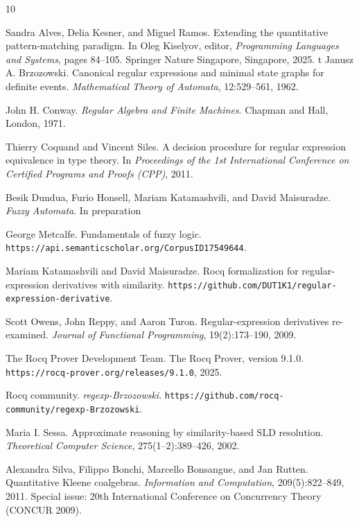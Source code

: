 \documentclass{easychair}
\begin{document}
\begin{thebibliography}{10}

Sandra Alves, Delia Kesner, and Miguel Ramos.
\newblock Extending the quantitative pattern-matching paradigm.
\newblock In Oleg Kiselyov, editor, \emph{Programming Languages and Systems},
pages 84--105.
\newblock Springer Nature Singapore, Singapore, 2025.
t
Janusz A. Brzozowski.
\newblock Canonical regular expressions and minimal state graphs for definite events.
\newblock \emph{Mathematical Theory of Automata}, 12:529--561, 1962.

John H. Conway.
\newblock \emph{Regular Algebra and Finite Machines}.
\newblock Chapman and Hall, London, 1971.

Thierry Coquand and Vincent Siles.
\newblock A decision procedure for regular expression equivalence in type theory.
\newblock In \emph{Proceedings of the 1st International Conference on Certified Programs and Proofs (CPP)}, 2011.

Besik Dundua, Furio Honsell, Mariam Katamashvili, and David Maisuradze.
\newblock \emph{Fuzzy Automata}.
\newblock In preparation

George Metcalfe.
\newblock Fundamentals of fuzzy logic.
\newblock \texttt{https://api.semanticscholar.org/CorpusID17549644}.

Mariam Katamashvili and David Maisuradze.
\newblock Rocq formalization for regular-expression derivatives with similarity.
\newblock \texttt{https://github.com/DUT1K1/regular-expression-derivative}.

Scott Owens, John Reppy, and Aaron Turon.
\newblock Regular-expression derivatives re-examined.
\newblock \emph{Journal of Functional Programming}, 19(2):173--190, 2009.

The Rocq Prover Development Team.
\newblock The Rocq Prover, version 9.1.0.
\newblock \texttt{https://rocq-prover.org/releases/9.1.0}, 2025.

Rocq community.
\newblock \emph{regexp-Brzozowski}.
\newblock \texttt{https://github.com/rocq-community/regexp-Brzozowski}.

Maria I. Sessa.
\newblock Approximate reasoning by similarity-based SLD resolution.
\newblock \emph{Theoretical Computer Science}, 275(1--2):389--426, 2002.

Alexandra Silva, Filippo Bonchi, Marcello Bonsangue, and Jan Rutten.
\newblock Quantitative Kleene coalgebras.
\newblock \emph{Information and Computation}, 209(5):822--849, 2011.
\newblock Special issue: 20th International Conference on Concurrency Theory
(CONCUR 2009).

\end{thebibliography}
\end{document}
